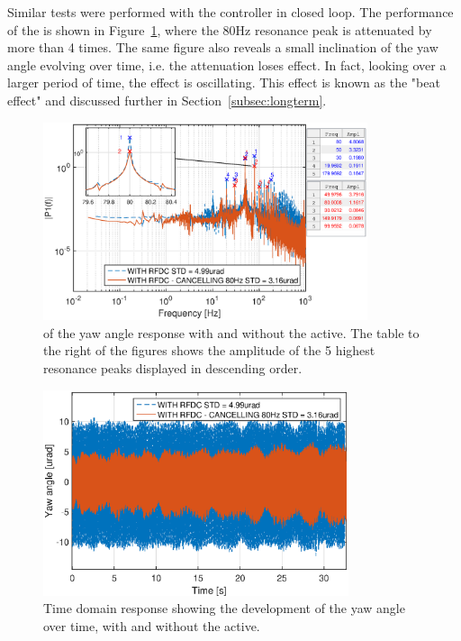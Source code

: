 Similar tests were performed with the controller in closed loop. The performance of the \abbrRFDC is shown in Figure~\ref{fig:fft_closedloop_80}, where the 80Hz resonance peak is attenuated by more than 4 times. The same figure also reveals a small inclination of the yaw angle evolving over time, i.e. the attenuation loses effect. In fact, looking over a larger period of time, the effect is oscillating. This effect is known as the "beat effect" and discussed further in Section~\ref{subsec:longterm}.

\begin{figure}[h]
  \centering %
  \includegraphics[width=0.85\textwidth]{fig/matlab/fft_closedloop_ext_disturbance_80Hz_with_zoom_2}
  \caption{\label{fig:fft_closedloop_80} \abbrFFT of the yaw angle response with and without the \abbrRFDC active. The table to the right of the figures shows the amplitude of the 5 highest resonance peaks displayed in descending order.}
\end{figure}

\begin{figure}[h]
  \centering %
  \includegraphics[width=0.8\textwidth]{fig/matlab/yl_closedloop_ext_disturbance_80Hz_2}
  \caption{\label{fig:yl_closedloop_80} Time domain response showing the development of the yaw angle over time, with and without the \abbrRFDC active.}
\end{figure}

